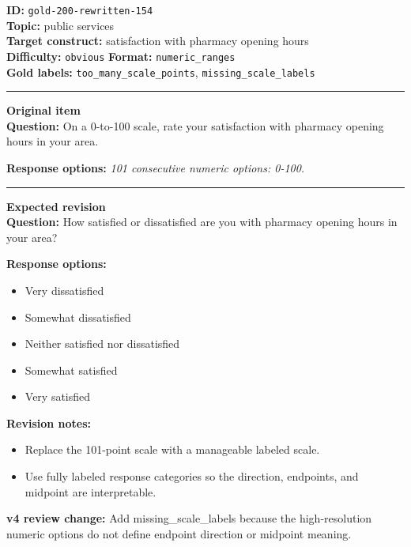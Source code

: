 \documentclass[10pt,a4paper]{article}
\newcommand{\sectionline}{\vspace{0.15em}\hrule\vspace{0.35em}}
\begin{document}
\begin{tcolorbox}[colframe=FlawRed,colback=white,colbacktitle=FlawRed!9,coltitle=black,title={Item 154\hfill Flawed item}]
\textbf{ID:} \texttt{gold-200-rewritten-154}\\
\textbf{Topic:} public services\\
\textbf{Target construct:} satisfaction with pharmacy opening hours\\
\textbf{Difficulty:} \texttt{obvious} \quad \textbf{Format:} \texttt{numeric\_ranges}\\
\textbf{Gold labels:} \texttt{too\_many\_scale\_points}, \texttt{missing\_scale\_labels}\\
\sectionline
\textbf{Original item}\\
\textbf{Question:} On a 0-to-100 scale, rate your satisfaction with pharmacy opening hours in your area.
\par\textbf{Response options:}
\textit{101 consecutive numeric options: 0-100.}
\sectionline
\textbf{Expected revision}\\
\textbf{Question:} How satisfied or dissatisfied are you with pharmacy opening hours in your area?
\par\textbf{Response options:}
\begin{itemize}
\item Very dissatisfied
\item Somewhat dissatisfied
\item Neither satisfied nor dissatisfied
\item Somewhat satisfied
\item Very satisfied
\end{itemize}
\par\textbf{Revision notes:}
\begin{itemize}
\item Replace the 101-point scale with a manageable labeled scale.
\item Use fully labeled response categories so the direction, endpoints, and midpoint are interpretable.
\end{itemize}
\par\textbf{v4 review change:} Add missing\_scale\_labels because the high-resolution numeric options do not define endpoint direction or midpoint meaning.
\end{tcolorbox}
\end{document}
